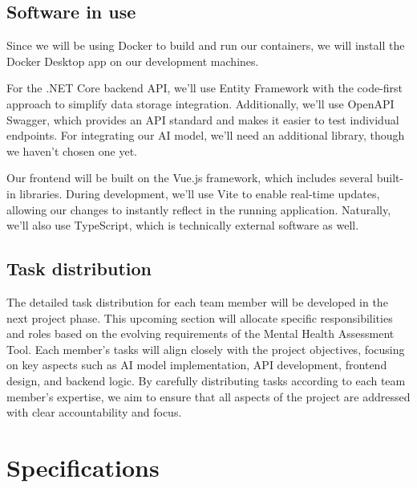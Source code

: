 \documentclass[conference]{IEEEtran}
\begin{document}
        \subsection {Software in use}

            Since we will be using Docker to build and run our containers, we will install the Docker Desktop app on our development machines.
            \newline

            For the .NET Core backend API, we’ll use Entity Framework with the code-first approach to simplify data storage integration. Additionally, we’ll use OpenAPI Swagger, which provides an API standard and makes it easier to test individual endpoints. For integrating our AI model, we’ll need an additional library, though we haven’t chosen one yet.
            \newline
            
            Our frontend will be built on the Vue.js framework, which includes several built-in libraries. During development, we’ll use Vite to enable real-time updates, allowing our changes to instantly reflect in the running application. Naturally, we’ll also use TypeScript, which is technically external software as well.
            \newline

        \subsection {Task distribution}

            The detailed task distribution for each team member will be 
            developed in the next project phase. This upcoming section 
            will allocate specific responsibilities and roles based 
            on the evolving requirements of the Mental Health Assessment 
            Tool. Each member’s tasks will align closely with the project 
            objectives, focusing on key aspects such as AI model 
            implementation, API development, frontend design, and backend 
            logic. By carefully distributing tasks according to each team 
            member’s expertise, we aim to ensure that all aspects of the 
            project are addressed with clear accountability and focus.
            \newline
    
    \section{Specifications}
\end{document}
